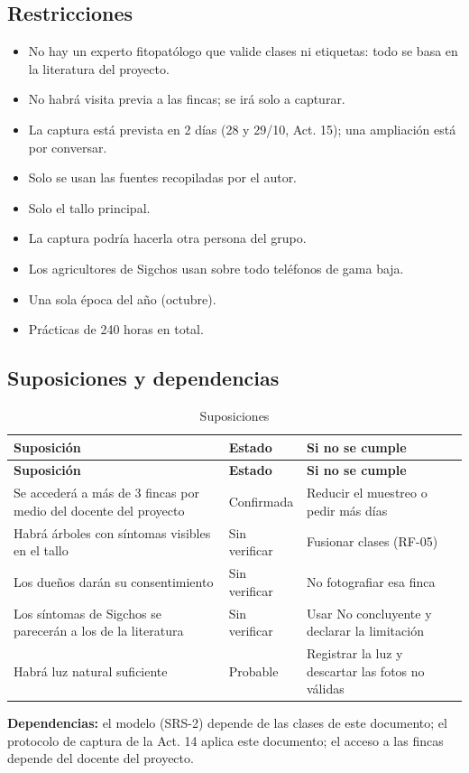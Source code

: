 \documentclass[11pt]{article}
\begin{document}
\subsection{Restricciones}
\begin{itemize}[leftmargin=1.2em,itemsep=2pt,topsep=2pt]
\item No hay un experto fitopatólogo que valide clases ni etiquetas: todo se basa en la literatura del proyecto.
\item No habrá visita previa a las fincas; se irá solo a capturar.
\item La captura está prevista en 2 días (28 y 29/10, Act. 15); una ampliación está por conversar.
\item Solo se usan las fuentes recopiladas por el autor.
\item Solo el tallo principal.
\item La captura podría hacerla otra persona del grupo.
\item Los agricultores de Sigchos usan sobre todo teléfonos de gama baja.
\item Una sola época del año (octubre).
\item Prácticas de 240 horas en total.
\end{itemize}
\subsection{Suposiciones y dependencias}
{\small
\begin{longtable}{|>{\RaggedRight\arraybackslash}p{6.73cm}|>{\RaggedRight\arraybackslash}p{2.31cm}|>{\RaggedRight\arraybackslash}p{5.58cm}|}
\caption{Suposiciones}\\
\hline
\rowcolor{encabezado}\textbf{Suposición} & \textbf{Estado} & \textbf{Si no se cumple} \\ \hline
\endfirsthead
\hline
\rowcolor{encabezado}\textbf{Suposición} & \textbf{Estado} & \textbf{Si no se cumple} \\ \hline
\endhead
Se accederá a más de 3 fincas por medio del docente del proyecto & Confirmada & Reducir el muestreo o pedir más días \\ \hline
Habrá árboles con síntomas visibles en el tallo & Sin verificar & Fusionar clases (RF-05) \\ \hline
Los dueños darán su consentimiento & Sin verificar & No fotografiar esa finca \\ \hline
Los síntomas de Sigchos se parecerán a los de la literatura & Sin verificar & Usar No concluyente y declarar la limitación \\ \hline
Habrá luz natural suficiente & Probable & Registrar la luz y descartar las fotos no válidas \\ \hline
\end{longtable}}
\textbf{Dependencias:} el modelo (SRS-2) depende de las clases de este documento; el protocolo de captura de la Act. 14 aplica este documento; el acceso a las fincas depende del docente del proyecto.
\end{document}
